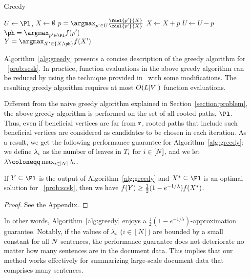 \documentclass[11pt,a4paper]{article}
\begin{document}
	\begin{algorithm}[tb]
		\caption{Greedy}  
		\label{alg:greedy}
		\begin{algorithmic}[1]
			\State $U\gets \Pl$, $X\gets\emptyset$ 
			\State $p=\argmax_{p^\prime\in U}\frac{\fdel{p^\prime}{X}}{\cdel{p^\prime}{X}}$ 
			\State $X\gets X+p$  
			\EndIf
			\State $U\gets U-p$ 
			\EndWhile
			\State $\ph=\argmax_{p^\prime\in \Pl}f(p^\prime)$ \\
			\Return $Y=\argmax_{X^\prime\in\{X, \ph\} } f(X^\prime) $ 
		\end{algorithmic}
	\end{algorithm}
	Algorithm~\ref{alg:greedy} presents 
	a concise description of 
	the greedy algorithm for \scskp~\eqref{prob:scsk}. 
	In practice, 
	function evaluations in the above greedy algorithm 
	can be reduced by using the technique provided 
	in~\cite{leskovec2007cost} with some modifications.  
	The resulting greedy algorithm requires 
	at most $O(L|V|)$ function evaluations. 
	
	Different from the naive greedy algorithm 
	explained in Section~\ref{section:problem}, 
	the above greedy algorithm is performed on the set of all rooted paths, $\Pl$. 
	Thus, even if beneficial vertices are far from ${\bf r}$, 
	rooted paths that include such beneficial vertices are considered as candidates to be chosen  
	in each iteration. 
	As a result, we get the following performance guarantee for Algorithm~\ref{alg:greedy}; 
	we define $\lambda_i$ as the number of leaves in ${T}_i$ for $i\in[N]$,  
	and we let $\nl\coloneqq \max_{i\in[\ns]}\nl_i$.  
	\begin{thm}		
		If $Y\subseteq \Pl$ is the output of Algorithm~\ref{alg:greedy} 
		and $X^*\subseteq \Pl$ is an optimal solution for \scskp~\eqref{prob:scsk}, 
		then we have $f(Y)\ge\frac{1}{2}(1-e^{-1/\lambda})f(X^*)$. 
	\end{thm}
	\begin{proof}
		See the Appendix. 
	\end{proof}
	
	In other words, 
	Algorithm~\ref{alg:greedy} enjoys a $\frac{1}{2}(1-e^{-1/\lambda})$-approximation guarantee. 
	Notably, if the values of $\lambda_i$ ($i\in[N]$)
	are bounded by a small constant for all $N$ sentences, 
	the performance guarantee does not deteriorate 
	no matter how many sentences are in the document data. 
	This implies that our method works effectively 
	for summarizing large-scale document data that comprises many sentences.  
	
\end{document}
